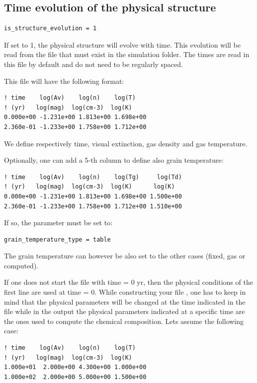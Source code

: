 \documentclass[english,a4paper,twoside]{article}
\begin{document}
\subsection{Time evolution of the physical structure}\label{sec:time_structure}
\begin{verbatim}
is_structure_evolution = 1
\end{verbatim}
If set to 1, the physical structure will evolve with time. This evolution will be read from the file  that must exist in the simulation folder. The times are read in this file by default and do not need to be regularly spaced. 

This file will have the following format:
\begin{verbatim}
! time    log(Av)    log(n)    log(T)
! (yr)   log(mag)  log(cm-3)  log(K)
0.000e+00 -1.231e+00 1.813e+00 1.698e+00
2.360e-01 -1.233e+00 1.758e+00 1.712e+00
\end{verbatim}
We define respectively time, visual extinction, gas density and gas temperature. 

Optionally, one can add a 5-th column to define also grain temperature:
\begin{verbatim}
! time    log(Av)    log(n)    log(Tg)     log(Td)
! (yr)   log(mag)  log(cm-3)  log(K)      log(K)
0.000e+00 -1.231e+00 1.813e+00 1.698e+00 1.500e+00
2.360e-01 -1.233e+00 1.758e+00 1.712e+00 1.510e+00
\end{verbatim}
If so, the parameter  must be set to:
\begin{verbatim}
grain_temperature_type = table
\end{verbatim}
The grain temperature can however be also set to the other cases (fixed, gas or computed).

If one does not start the file with time = 0 yr, then the physical conditions of the first line are used at time = 0. While constructing your file  , one has to keep in mind that the physical parameters will be changed at the time indicated in the file while in the output the physical parameters indicated at a specific time are the ones used to compute the chemical composition. Lets assume the following case: 
\begin{verbatim}
! time    log(Av)    log(n)    log(T)     
! (yr)   log(mag)  log(cm-3)  log(K)     
1.000e+01  2.000e+00 4.300e+00 1.000e+00 
1.000e+02  2.000e+00 5.000e+00 1.500e+00 
\end{verbatim}
\end{document}

